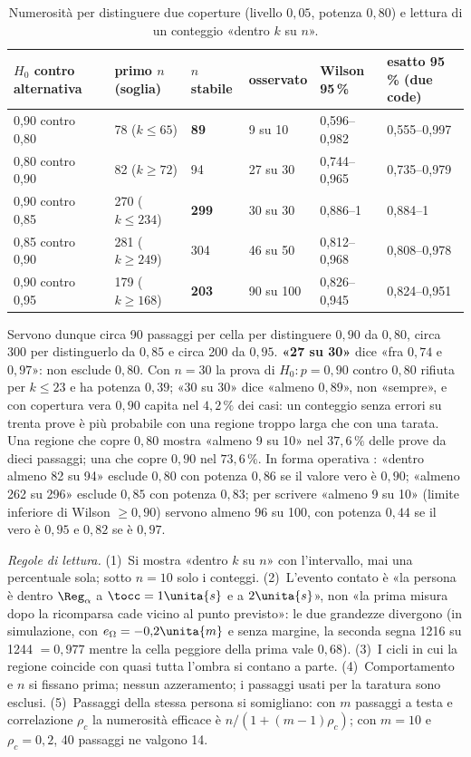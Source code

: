 \begin{table}[H]\centering\footnotesize
\caption{Numerosità per distinguere due coperture (livello $0{,}05$, potenza $0{,}80$) e lettura di un conteggio «dentro $k$ su $n$». }\label{tab:val-numerosita}
\begin{tabular}{@{}lll@{\hspace{2.2em}}lll@{}}
\toprule
$H_0$ contro alternativa & primo $n$ (soglia) & $n$ stabile & osservato & Wilson 95\,\% & esatto 95\,\% (due code)\\
\midrule
0,90 contro 0,80 & 78 ($k\le65$) & \textbf{89} & 9 su 10 & 0,596–0,982 & 0,555–0,997\\
0,80 contro 0,90 & 82 ($k\ge72$) & 94 & 27 su 30 & 0,744–0,965 & 0,735–0,979\\
0,90 contro 0,85 & 270 ($k\le234$) & \textbf{299} & 30 su 30 & 0,886–1 & 0,884–1\\
0,85 contro 0,90 & 281 ($k\ge249$) & 304 & 46 su 50 & 0,812–0,968 & 0,808–0,978\\
0,90 contro 0,95 & 179 ($k\ge168$) & \textbf{203} & 90 su 100 & 0,826–0,945 & 0,824–0,951\\
\bottomrule
\end{tabular}
\end{table}

Servono dunque circa 90 passaggi per cella per distinguere $0{,}90$ da $0{,}80$, circa 300 per distinguerlo da $0{,}85$ e circa 200 da $0{,}95$. \textbf{«27 su 30»} dice «fra $0{,}74$ e $0{,}97$»: non esclude $0{,}80$. Con $n=30$ la prova di $H_0\colon p=0{,}90$ contro $0{,}80$ rifiuta per $k\le23$ e ha potenza $0{,}39$; «30 su 30» dice «almeno $0{,}89$», non «sempre», e con copertura vera $0{,}90$ capita nel $4{,}2\,\%$ dei casi: un conteggio senza errori su trenta prove è più probabile con una regione troppo larga che con una tarata. Una regione che copre $0{,}80$ mostra «almeno 9 su 10» nel $37{,}6\,\%$ delle prove da dieci passaggi; una che copre $0{,}90$ nel $73{,}6\,\%$. In forma operativa : «dentro almeno 82 su 94» esclude $0{,}80$ con potenza $0{,}86$ se il valore vero è $0{,}90$; «almeno 262 su 296» esclude $0{,}85$ con potenza $0{,}83$; per scrivere «almeno 9 su 10» (limite inferiore di Wilson $\ge0{,}90$) servono almeno 96 su 100, con potenza $0{,}44$ se il vero è $0{,}95$ e $0{,}82$ se è $0{,}97$.

\emph{Regole di lettura.} (1)~Si mostra «dentro $k$ su $n$» con l'intervallo, mai una percentuale sola; sotto $n=10$ solo i conteggi. (2)~L'evento contato è «la persona è dentro $\Reg_\alpha$ a $\tocc=1\unita{s}$ e a $2\unita{s}$», non «la prima misura dopo la ricomparsa cade vicino al punto previsto»: le due grandezze divergono (in simulazione, con $e_\Omega=-0{,}2\unita{m}$ e senza margine, la seconda segna 1216 su 1244 $=0{,}977$ mentre la cella peggiore della prima vale $0{,}68$). (3)~I cicli in cui la regione coincide con quasi tutta l'ombra si contano a parte. (4)~Comportamento e $n$ si fissano prima; nessun azzeramento; i passaggi usati per la taratura sono esclusi. (5)~Passaggi della stessa persona si somigliano: con $m$ passaggi a testa e correlazione $\rho_c$ la numerosità efficace è $n/(1+(m-1)\rho_c)$; con $m=10$ e $\rho_c=0{,}2$, 40 passaggi ne valgono 14.

